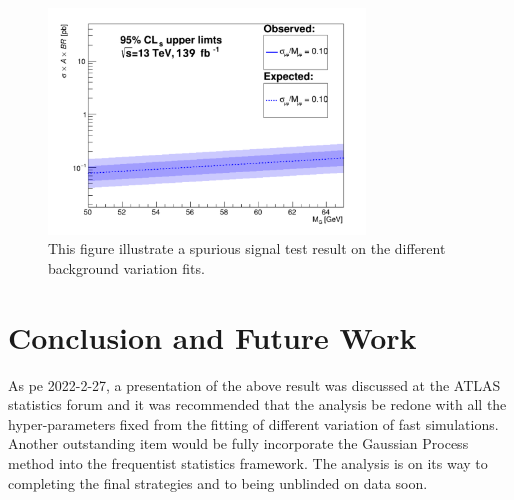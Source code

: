 \begin{figure}[!htb]
   \begin{center}
       \includegraphics[width=0.75\textwidth]{figures/chapter_dimuon/limits}
       \caption{
       This figure illustrate a spurious signal test result on the different background variation fits.}
        \label{fig:limits}
   \end{center}
\end{figure}
\FloatBarrier

\section{Conclusion and Future Work}
As pe 2022-2-27, a presentation of the above result was discussed at the ATLAS statistics forum and it was recommended that the analysis be redone with all the hyper-parameters fixed from the fitting of different variation of fast simulations. Another outstanding item would be fully incorporate the Gaussian Process method into the frequentist statistics framework. 
The analysis is on its way to completing the final strategies and to being unblinded on data soon.




